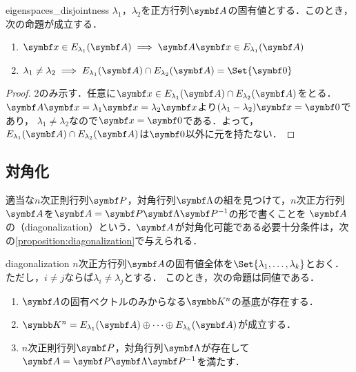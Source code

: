 \documentclass[../../main]{subfiles}
\begin{document}
\begin{proposition}{}{eigenspaces_disjointness}
  \(\lambda_1\)，\(\lambda_2\)を正方行列\(\mat{A}\)の固有値とする．このとき，次の命題が成立する．
  \begin{enumerate}
    \item \(\vect{x}\in E_{\lambda_1}(\mat{A})\implies\mat{A}\vect{x}\in E_{\lambda_1}(\mat{A})\)
    \item \(\lambda_1\neq\lambda_2\implies E_{\lambda_1}(\mat{A})\cap E_{\lambda_2}(\mat{A})=\Set{\zvec}\)
  \end{enumerate}
\end{proposition}

\begin{proof}
  2のみ示す．任意に\(\vect{x}\in E_{\lambda_1}(\mat{A})\cap E_{\lambda_2}(\mat{A})\)をとる．\(\mat{A}\vect{x}=\lambda_1\vect{x}=\lambda_2\vect{x}\)より\((\lambda_1-\lambda_2)\vect{x}=\zvec\)であり，
  \(\lambda_1\neq\lambda_2\)なので\(\vect{x}=\zvec\)である．よって，\(E_{\lambda_1}(\mat{A})\cap E_{\lambda_2}(\mat{A})\)は\(\zvec\)以外に元を持たない．
\end{proof}

\subsection{対角化}

適当な\(n\)次正則行列\(\mat{P}\)，対角行列\(\mat{\Lambda}\)の組を見つけて，\(n\)次正方行列\(\mat{A}\)を\(\mat{A}=\mat{P}\mat{\Lambda}\mat{P}^{-1}\)の形で書くことを
\(\mat{A}\)の（diagonalization）という．\(\mat{A}\)が対角化可能である必要十分条件は，次の\cref{proposition:diagonalization}で与えられる．

\begin{proposition}{}{diagonalization}
  \(n\)次正方行列\(\mat{A}\)の固有値全体を\(\Set{\lambda_1,\dots,\lambda_k}\)とおく．ただし，\(i\neq j\)ならば\(\lambda_i\neq\lambda_j\)とする．
  このとき，次の命題は同値である．

  \begin{enumerate}
    \item \(\mat{A}\)の固有ベクトルのみからなる\(\numset{K}^n\)の基底が存在する．
    \item \(\numset{K}^n=E_{\lambda_1}(\mat{A})\oplus\dots\oplus E_{\lambda_k}(\mat{A})\)が成立する．
    \item \(n\)次正則行列\(\mat{P}\)，対角行列\(\mat{\Lambda}\)が存在して\(\mat{A}=\mat{P}\mat{\Lambda}\mat{P}^{-1}\)を満たす．
  \end{enumerate}
\end{proposition}
\end{document}
